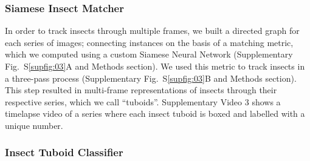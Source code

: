 \documentclass[fleqn,10pt]{wlscirep}
\begin{document}
\subsubsection*{Siamese Insect Matcher}
In order to track insects through multiple frames, we built a directed graph for each series of images; connecting instances on the basis of a matching metric, which we computed using a custom Siamese Neural Network (Supplementary Fig.~S\ref{supfig:03}A and Methods section). We used this metric to track insects in a three-pass process (Supplementary Fig.~S\ref{supfig:03}B and Methods section). This step resulted in multi-frame representations of insects through their respective series, which we call “tuboids”. Supplementary Video 3 shows a timelapse video of a series where each insect tuboid is boxed and labelled with a unique number.

\subsubsection*{Insect Tuboid Classifier}
\end{document}
